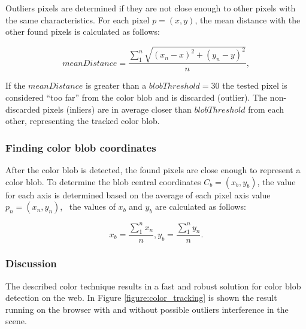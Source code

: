 Outliers pixels are determined if they are not close enough to other pixels with the same characteristics. For each pixel $p=(x,y)$, the mean distance with the other found pixels is calculated as follows:

$$meanDistance=\frac{\sum_{1}^{n}\sqrt{(x_n-x)^2 + (y_n-y)^2}} {n},$$

If the $meanDistance$ is greater than a $blobThreshold=30$ the tested pixel is considered ``too far'' from the color blob and is discarded (outlier). The non-discarded pixels (inliers) are in average closer than $blobThreshold$ from each other, representing the tracked color blob.


\subsubsection{Finding color blob coordinates}
\label{sub:tracking_library_for_the_web:color_tracking_algorithm:color_blob_detection:finding_color_blobs_coordinates}

After the color blob is detected, the found pixels are close enough to represent a color blob. To determine the blob central coordinates $C_b=(x_b,y_b)$, the value for each axis is determined based on the average of each pixel axis value $p_n=(x_n,y_n)$, \ie\ the values of $x_b$ and $y_b$ are calculated as follows:

$$x_b=\frac{\sum_{1}^{n}x_n}{n}, y_b=\frac{\sum_{1}^{n}y_n}{n}.$$


\subsubsection{Discussion}
\label{sub:tracking_library_for_the_web:color_tracking_algorithm:color_blob_detection:discussion}

The described color technique results in a fast and robust solution for color blob detection on the web. In Figure \ref{figure:color_tracking} is shown the result running on the browser with and without possible outliers interference in the scene.


